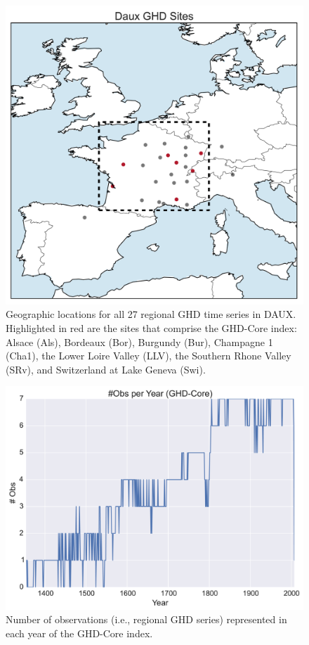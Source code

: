 \documentclass[12pt]{article}
\begin{document}
\pagebreak

\renewcommand{\figurename}{Supplementary Figure}
\setcounter{figure}{0}

\begin{figure}
\center
\includegraphics[width=1.0\columnwidth,scale=2]{SUPP_fig_01_map_sitelocs.png}
\caption{Geographic locations for all 27 regional GHD time series in DAUX. Highlighted in red are the sites that comprise the GHD-Core index: Alsace (Als), Bordeaux (Bor), Burgundy (Bur), Champagne 1 (Cha1), the Lower Loire Valley (LLV), the Southern Rhone Valley (SRv), and Switzerland at Lake Geneva (Swi).}
\end{figure}

\begin{figure}
\center
\includegraphics[width=1.0\columnwidth,scale=2]{SUPP_fig_02_numobs.png}
\caption{Number of observations (i.e., regional GHD series) represented in each year of the GHD-Core index.}
\end{figure}
\end{document}
